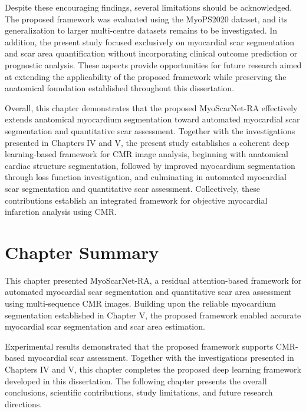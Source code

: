 Despite these encouraging findings, several limitations should be acknowledged. The proposed framework was evaluated using the MyoPS2020 dataset, and its generalization to larger multi-centre datasets remains to be investigated. In addition, the present study focused exclusively on myocardial scar segmentation and scar area quantification without incorporating clinical outcome prediction or prognostic analysis. These aspects provide opportunities for future research aimed at extending the applicability of the proposed framework while preserving the anatomical foundation established throughout this dissertation.

Overall, this chapter demonstrates that the proposed MyoScarNet-RA effectively extends anatomical myocardium segmentation toward automated myocardial scar segmentation and quantitative scar assessment. Together with the investigations presented in Chapters IV and V, the present study establishes a coherent deep learning-based framework for CMR image analysis, beginning with anatomical cardiac structure segmentation, followed by improved myocardium segmentation through loss function investigation, and culminating in automated myocardial scar segmentation and quantitative scar assessment. Collectively, these contributions establish an integrated framework for objective myocardial infarction analysis using CMR.

\section{Chapter Summary}
\label{sec:ch6-summary}

This chapter presented MyoScarNet-RA, a residual attention-based framework for automated myocardial scar segmentation and quantitative scar area assessment using multi-sequence CMR images. Building upon the reliable myocardium segmentation established in Chapter V, the proposed framework enabled accurate myocardial scar segmentation and scar area estimation.

Experimental results demonstrated that the proposed framework supports CMR-based myocardial scar assessment. Together with the investigations presented in Chapters IV and V, this chapter completes the proposed deep learning framework developed in this dissertation. The following chapter presents the overall conclusions, scientific contributions, study limitations, and future research directions.
